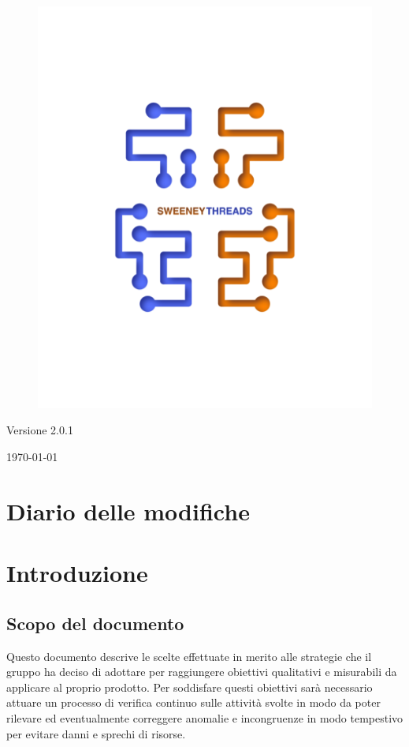 \documentclass[a4paper]{article}
\begin{document}
\begin{titlepage}
		\begin{figure}[H]
			\centering
			\includegraphics[scale=0.8]{sweeney.png}
		\end{figure}
		\begin{center}
			Versione 2.0.1
		\end{center}
		{\large \today}\\[3cm] 
		\vfill  
	\end{titlepage}
	
	\tableofcontents
	\newpage
	\section*{Diario delle modifiche}
     
	\newpage
    \section{Introduzione}
		\subsection{Scopo del documento}
			Questo documento descrive le scelte effettuate in merito alle strategie 
			che il gruppo ha deciso di adottare per raggiungere obiettivi qualitativi e misurabili da 
			applicare al proprio prodotto. Per soddisfare questi obiettivi sarà necessario attuare un 
			processo di verifica continuo sulle attività svolte in modo da poter rilevare ed eventualmente 
			correggere anomalie e incongruenze in modo tempestivo per evitare danni e sprechi di risorse.
\end{document}

